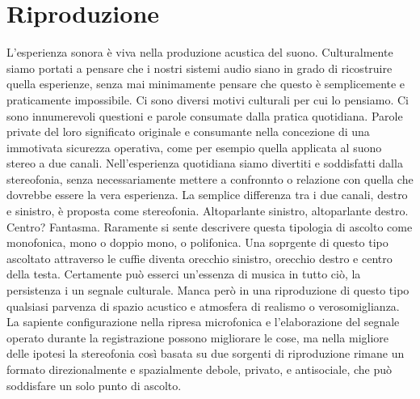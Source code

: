
\section{Riproduzione}

L'esperienza sonora è viva nella produzione acustica del suono. Culturalmente
siamo portati a pensare che i nostri sistemi audio siano in grado di ricostruire
quella esperienze, senza mai minimamente pensare che questo è semplicemente e
praticamente impossibile. Ci sono diversi motivi culturali per cui lo pensiamo.
Ci sono innumerevoli questioni e parole consumate dalla pratica quotidiana.
Parole private del loro significato originale e consumante nella concezione di
una immotivata sicurezza operativa, come per esempio quella applicata al suono
stereo a due canali. Nell'esperienza quotidiana siamo divertiti e soddisfatti
dalla stereofonia, senza necessariamente mettere a confronnto o relazione con
quella che dovrebbe essere la vera esperienza. La semplice differenza tra i due
canali, destro e sinistro, è proposta come stereofonia. Altoparlante sinistro,
altoparlante destro. Centro? Fantasma. Raramente si sente descrivere questa
tipologia di ascolto come monofonica, mono o doppio mono, o polifonica. Una
soprgente di questo tipo ascoltato attraverso le cuffie diventa orecchio
sinistro, orecchio destro e centro della testa. Certamente può esserci
un'essenza di musica in tutto ciò, la persistenza i un segnale culturale. Manca
però in una riproduzione di questo tipo qualsiasi parvenza di spazio acustico e
atmosfera di realismo o verosomiglianza. La sapiente configurazione nella
ripresa microfonica e l'elaborazione del segnale operato  durante la
registrazione possono migliorare le cose, ma nella migliore delle ipotesi la
stereofonia così basata su due sorgenti di riproduzione rimane un formato
direzionalmente e spazialmente debole, privato, e antisociale, che può soddisfare
un solo punto di ascolto.




